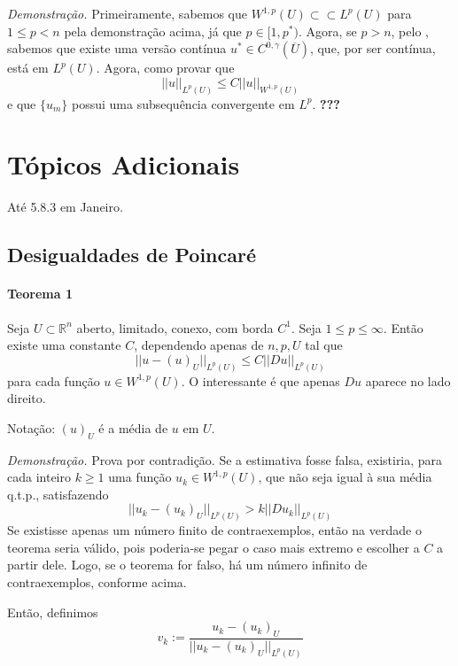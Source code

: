 \documentclass[a4paper, 11pt]{article}
\begin{document}
\textit{Demonstração.} Primeiramente, sabemos que $W^{1,p}(U) \subset\subset L^p(U)$ para $1\leq p < n$ pela demonstração acima, já que $p \in [1,p^*)$. Agora, se $p>n$, pelo , sabemos que existe uma versão contínua $u^* \in C^{0, \gamma}(\overline{U})$, que, por ser contínua, está em $L^p(U)$. Agora, como provar que \[ ||u||_{L^p(U)} \leq C ||u||_{W^{1,p}(U)} \] e que $\{u_m\}$ possui uma subsequência convergente em $L^p$. \textbf{???}








\section{Tópicos Adicionais}

Até 5.8.3 em Janeiro.


\subsection{Desigualdades de Poincaré}

\paragraph{Teorema 1}\label{t:sobolev-poincare-1} Seja \(U \subset \mathbb{R}^n \) aberto, limitado, conexo, com borda \(C^1\). Seja \(1 \leq p \leq \infty \). Então existe uma constante \(C\), dependendo apenas de \(n, p, U\) tal que \[ ||u- (u)_U ||_{L^p(U)} \leq C ||Du||_{L^p(U)} \] para cada função \(u \in W^{1,p}(U)\). O interessante é que apenas \(Du\) aparece no lado direito.

Notação: \((u)_U\) é a média de \(u\) em \(U\).

\textit{Demonstração.} Prova por contradição. Se a estimativa fosse falsa, existiria, para cada inteiro $k\geq1$ uma função $u_k \in W^{1,p}(U)$, que não seja igual à sua média q.t.p., satisfazendo \begin{equation}\label{eq:desig-poincare-1}
	 ||u_k - (u_k)_U ||_{L^p(U)} > k || Du_k ||_{L^p(U)}
\end{equation} Se existisse apenas um número finito de contraexemplos, então na verdade o teorema seria válido, pois poderia-se pegar o caso mais extremo e escolher a $C$ a partir dele. Logo, se o teorema for falso, há um número infinito de contraexemplos, conforme acima.

Então, definimos \[v_k := \frac{u_k - (u_k)_U}{||u_k - (u_k)_U||_{L^p(U)}} \]
\end{document}
